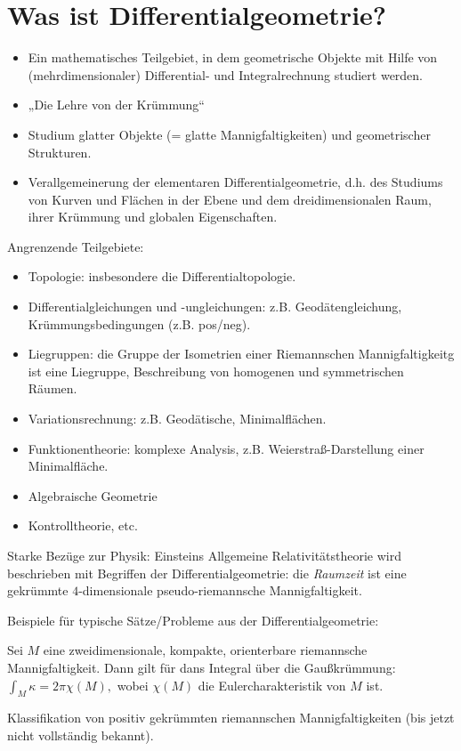 
\section{Was ist Differentialgeometrie?}

\begin{itemize}
    \item
        Ein mathematisches Teilgebiet, in dem geometrische Objekte mit Hilfe von (mehrdimensionaler) Differential- und Integralrechnung studiert werden.
    \item
        „Die Lehre von der Krümmung“
    \item
        Studium glatter Objekte (= glatte Mannigfaltigkeiten) und geometrischer Strukturen.
    \item
        Verallgemeinerung der elementaren Differentialgeometrie, d.h. des Studiums von Kurven und Flächen in der Ebene und dem dreidimensionalen Raum, ihrer Krümmung und globalen Eigenschaften.
\end{itemize}

Angrenzende Teilgebiete:
\begin{itemize}
    \item
        Topologie: insbesondere die Differentialtopologie.
    \item
        Differentialgleichungen und -ungleichungen: z.B. Geodätengleichung, Krümmungsbedingungen (z.B. pos/neg).
    \item
        Liegruppen: die Gruppe der Isometrien einer Riemannschen Mannigfaltigkeitg ist eine Liegruppe, Beschreibung von homogenen und symmetrischen Räumen.
    \item
        Variationsrechnung: z.B. Geodätische, Minimalflächen.
    \item
        Funktionentheorie: komplexe Analysis, z.B. Weierstraß-Darstellung einer Minimalfläche.
    \item
        Algebraische Geometrie
    \item
        Kontrolltheorie, etc.
\end{itemize}

Starke Bezüge zur Physik:
Einsteins Allgemeine Relativitätstheorie wird beschrieben mit Begriffen der Differentialgeometrie: die \emph{Raumzeit} ist eine gekrümmte $4$-dimensionale pseudo-riemannsche Mannigfaltigkeit.

Beispiele für typische Sätze/Probleme aus der Differentialgeometrie:

\begin{st}
    Sei $M$ eine zweidimensionale, kompakte, orienterbare riemannsche Mannigfaltigkeit.
    Dann gilt für dans Integral über die Gaußkrümmung:
    \begin{math}
        \int_M \kappa = 2 \pi \chi(M),
    \end{math}
    wobei $\chi(M)$ die Eulercharakteristik von $M$ ist.
\end{st}

\begin{prob}
    Klassifikation von positiv gekrümmten riemannschen Mannigfaltigkeiten (bis jetzt nicht vollständig bekannt).
\end{prob}




